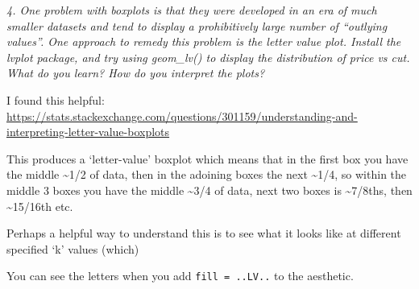 \documentclass[]{book}
\newenvironment{Shaded}{\begin{snugshade}}{\end{snugshade}}
\newcommand{\DataTypeTok}[1]{\textcolor[rgb]{0.13,0.29,0.53}{#1}}
\newcommand{\DecValTok}[1]{\textcolor[rgb]{0.00,0.00,0.81}{#1}}
\newcommand{\FloatTok}[1]{\textcolor[rgb]{0.00,0.00,0.81}{#1}}
\newcommand{\KeywordTok}[1]{\textcolor[rgb]{0.13,0.29,0.53}{\textbf{#1}}}
\newcommand{\NormalTok}[1]{#1}
\newcommand{\OperatorTok}[1]{\textcolor[rgb]{0.81,0.36,0.00}{\textbf{#1}}}
\newcommand{\StringTok}[1]{\textcolor[rgb]{0.31,0.60,0.02}{#1}}
\theoremstyle{definition}
\theoremstyle{definition}
\theoremstyle{definition}
\theoremstyle{remark}
\begin{document}
\emph{4. One problem with boxplots is that they were developed in an era
of much smaller datasets and tend to display a prohibitively large
number of ``outlying values''. One approach to remedy this problem is
the letter value plot. Install the lvplot package, and try using
geom\_lv() to display the distribution of price vs cut. What do you
learn? How do you interpret the plots?}

I found this helpful:
\url{https://stats.stackexchange.com/questions/301159/understanding-and-interpreting-letter-value-boxplots}

This produces a `letter-value' boxplot which means that in the first box
you have the middle \textasciitilde{}1/2 of data, then in the adoining
boxes the next \textasciitilde{}1/4, so within the middle 3 boxes you
have the middle \textasciitilde{}3/4 of data, next two boxes is
\textasciitilde{}7/8ths, then \textasciitilde{}15/16th etc.

\begin{Shaded}
\end{Shaded}

Perhaps a helpful way to understand this is to see what it looks like at
different specified `k' values (which)

You can see the letters when you add \texttt{fill\ =\ ..LV..} to the
aesthetic.

\begin{Shaded}
\end{Shaded}
\end{document}
